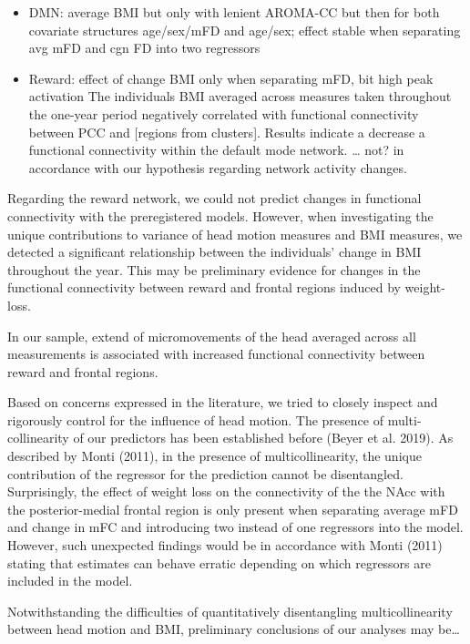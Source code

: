 \documentclass[
]{article}
\providecommand{\tightlist}{%
  \setlength{\itemsep}{0pt}\setlength{\parskip}{0pt}}
\begin{document}
\begin{itemize}
\tightlist
\item
  DMN: average BMI but only with lenient AROMA-CC but then for both covariate structures age/sex/mFD and age/sex; effect stable when separating avg mFD and cgn FD into two regressors
\item
  Reward: effect of change BMI only when separating mFD, bit high peak activation
  The individuals BMI averaged across measures taken throughout the one-year period negatively correlated with functional connectivity between PCC and {[}regions from clusters{]}. Results indicate a decrease a functional connectivity within the default mode network.
  \ldots{} not? in accordance with our hypothesis regarding network activity changes.
\end{itemize}

Regarding the reward network, we could not predict changes in functional connectivity with the preregistered models.
However, when investigating the unique contributions to variance of head motion measures and BMI measures, we detected a significant relationship between the individuals' change in BMI throughout the year.
This may be preliminary evidence for changes in the functional connectivity between reward and frontal regions induced by weight-loss.

In our sample, extend of micromovements of the head averaged across all measurements is associated with increased functional connectivity between reward and frontal regions.

Based on concerns expressed in the literature, we tried to closely inspect and rigorously control for the influence of head motion. The presence of multi-collinearity of our predictors has been established before (Beyer et al. 2019). As described by Monti (2011), in the presence of multicollinearity, the unique contribution of the regressor for the prediction cannot be disentangled.
Surprisingly, the effect of weight loss on the connectivity of the the NAcc with the posterior-medial frontal region is only present when separating average mFD and change in mFC and introducing two instead of one regressors into the model.
However, such unexpected findings would be in accordance with Monti (2011) stating that estimates can behave erratic depending on which regressors are included in the model.

Notwithstanding the difficulties of quantitatively disentangling multicollinearity between head motion and BMI, preliminary conclusions of our analyses may be\ldots{}
\end{document}
